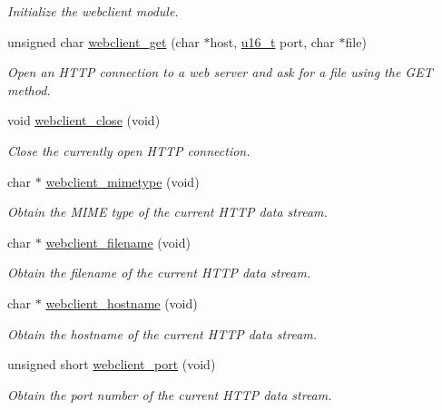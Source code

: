 \begin{CompactItemize}
\begin{CompactList}\small\item\em Initialize the webclient module. \item\end{CompactList}\item 
unsigned char \hyperlink{a00079_gf9385ef9ecc74c7d53ff2f15e62bfde3}{webclient\_\-get} (char $\ast$host, \hyperlink{a00070_gfc6499c1f28697aa3bfc2804d496fd11}{u16\_\-t} port, char $\ast$file)
\begin{CompactList}\small\item\em Open an HTTP connection to a web server and ask for a file using the GET method. \item\end{CompactList}\item 
\hypertarget{a00079_g1d34be506a61db90dd7829117efdf8cf}{
void \hyperlink{a00079_g1d34be506a61db90dd7829117efdf8cf}{webclient\_\-close} (void)}
\label{a00079_g1d34be506a61db90dd7829117efdf8cf}

\begin{CompactList}\small\item\em Close the currently open HTTP connection. \item\end{CompactList}\item 
char $\ast$ \hyperlink{a00079_g4433d3af16ea083a81576d0f18ba57c9}{webclient\_\-mimetype} (void)
\begin{CompactList}\small\item\em Obtain the MIME type of the current HTTP data stream. \item\end{CompactList}\item 
char $\ast$ \hyperlink{a00079_g41e616d3fcc17e0aabfe8ab45ef0d30f}{webclient\_\-filename} (void)
\begin{CompactList}\small\item\em Obtain the filename of the current HTTP data stream. \item\end{CompactList}\item 
char $\ast$ \hyperlink{a00079_g0e0ea5f24b77f124ba33bcbc7ede5bfb}{webclient\_\-hostname} (void)
\begin{CompactList}\small\item\em Obtain the hostname of the current HTTP data stream. \item\end{CompactList}\item 
unsigned short \hyperlink{a00079_g2a939aa4fcffabbce1dc1f784a7e0ad3}{webclient\_\-port} (void)
\begin{CompactList}\small\item\em Obtain the port number of the current HTTP data stream. \item\end{CompactList}\end{CompactItemize}
